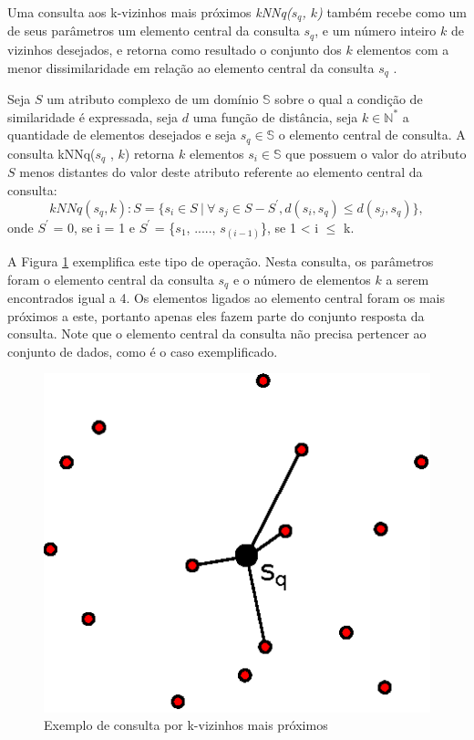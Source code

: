 Uma consulta aos k-vizinhos mais próximos \textit{kNNq($s_q$, $k$)} também recebe como um de seus parâmetros um elemento central da consulta $s_q$, e um número inteiro $k$ de vizinhos desejados, e retorna
como resultado o conjunto dos $k$ elementos com a menor dissimilaridade em relação ao elemento central da consulta $s_q$ \cite{POLA2010}.

\begin{mydef}
  \label{def:def_knnq}
  Seja $S$ um atributo complexo de um domínio $\mathbb{S}$ sobre o qual a condição de similaridade é expressada, seja $d$ uma
  função de distância, seja $k \in \mathbb{N^*}$ a quantidade de elementos desejados e seja $s_q \in \mathbb{S}$ o elemento
  central de consulta. A consulta kNNq($s_q$ , $k$) retorna $k$ elementos $s_i \in \mathbb{S}$ que possuem o valor do atributo $S$ menos distantes do valor 
  deste atributo referente ao elemento central da consulta\cite{Ferreira2009}:
  \begin{equation} \label{eq:knnq}   
    kNNq(s_q, k): S = \{s_i \in S \ |\  \forall \ s_j \in S - S^{'}, d(s_i, s_q)\leq d(s_j, s_q)\},
  \end{equation}
  onde $S^{'}$ = 0, se i = 1 e $S^{'}$ = \{$s_1$, ....., $s_{(i-1)}$\}, se 1 < i $\leq$ k. 
\end{mydef}

A Figura \ref{fig:exemploknnq} exemplifica este tipo de operação. Nesta consulta, os parâmetros foram o elemento central da consulta $s_q$ e o número de elementos $k$ a serem
encontrados igual a 4. Os elementos ligados ao elemento central foram os mais próximos a este, portanto apenas eles fazem parte do conjunto resposta da consulta. Note que o elemento
central da consulta não precisa pertencer ao conjunto de dados, como é o caso exemplificado.
\begin{figure}[H]
\centering
\includegraphics[width=.4\textwidth]{dados/figuras/knnq.eps}
\caption{Exemplo de consulta por k-vizinhos mais próximos}
\label{fig:exemploknnq}
\end{figure}


